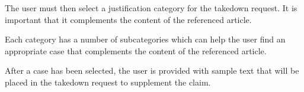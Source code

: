 \begin{minipage}{\textwidth}
  \centering
  \begin{minipage}[t]{4.6cm}
    \vspace{0pt}
    \centering
    \begin{minipage}{4.4cm}
      The user must then select a justification category for the takedown request. It is important that it complements the content of the referenced article.
    \end{minipage}
  \end{minipage}
  \begin{minipage}[t]{4.6cm}
    \vspace{0pt}
    \centering
    \begin{minipage}{4.4cm}
      Each category has a number of subcategories which can help the user find an appropriate case that complements the content of the referenced article.
    \end{minipage}
  \end{minipage}
  \begin{minipage}[t]{4.6cm}
    \vspace{0pt}
    \centering
    \begin{minipage}{4.4cm}
      After a case has been selected, the user is provided with sample text that will be placed in the takedown request to supplement the claim.
    \end{minipage}
  \end{minipage}
\end{minipage}

